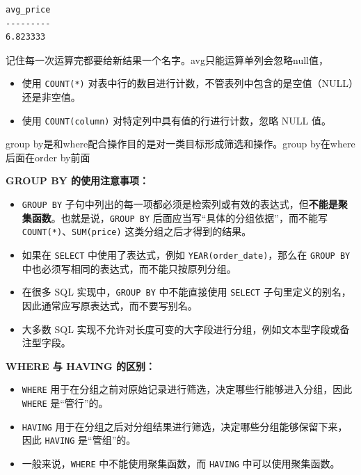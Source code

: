 \begin{lstlisting}
avg_price
---------
6.823333
\end{lstlisting}
\begin{dxtips}
    记住每一次运算完都要给新结果一个名字。avg只能运算单列会忽略null值，\begin{itemize}
\item 使用 \texttt{COUNT(*)} 对表中行的数目进行计数，不管表列中包含的是空值（NULL）还是非空值。
\item 使用 \texttt{COUNT(column)} 对特定列中具有值的行进行计数，忽略 NULL 值。
\end{itemize}
\end{dxtips}
\begin{dxtips}
    group by是和where配合操作目的是对一类目标形成筛选和操作。group
by在where 后面在order by前面
\end{dxtips}
\begin{note}
\textbf{GROUP BY 的使用注意事项：}
\begin{itemize}
    \item \texttt{GROUP BY} 子句中列出的每一项都必须是检索列或有效的表达式，但\textbf{不能是聚集函数}。也就是说，\texttt{GROUP BY} 后面应当写“具体的分组依据”，而不能写 \texttt{COUNT(*)}、\texttt{SUM(price)} 这类分组之后才得到的结果。

    \item 如果在 \texttt{SELECT} 中使用了表达式，例如 \texttt{YEAR(order\_date)}，那么在 \texttt{GROUP BY} 中也必须写相同的表达式，而不能只按原列分组。

    \item 在很多 SQL 实现中，\texttt{GROUP BY} 中不能直接使用 \texttt{SELECT} 子句里定义的别名，因此通常应写原表达式，而不要写别名。

    \item 大多数 SQL 实现不允许对长度可变的大字段进行分组，例如文本型字段或备注型字段。
\end{itemize}
\end{note}
\begin{note}
\textbf{WHERE 与 HAVING 的区别：}
\begin{itemize}
    \item \texttt{WHERE} 用于在分组之前对原始记录进行筛选，决定哪些行能够进入分组，因此 \texttt{WHERE} 是“管行”的。
    \item \texttt{HAVING} 用于在分组之后对分组结果进行筛选，决定哪些分组能够保留下来，因此 \texttt{HAVING} 是“管组”的。
    \item 一般来说，\texttt{WHERE} 中不能使用聚集函数，而 \texttt{HAVING} 中可以使用聚集函数。
\end{itemize}
\end{note}

